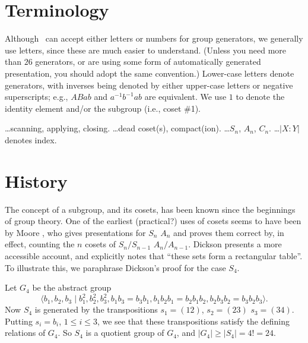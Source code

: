 
%
%

\section{Terminology}

Although \ace\ can accept either letters or numbers for group generators,
  we generally use letters, since these are much easier to understand.
(Unless you need more than $26$ generators, or are using some form of 
  automatically generated presentation, you should adopt the same
  convention.)
Lower-case letters denote generators, with inverses being denoted by either
  upper-case letters or negative superscripts; e.g., $ABab$ and
  $a^{-1}b^{-1}ab$ are equivalent.
We use $1$ to denote the identity element and/or the subgroup (i.e.,
  coset \#1).

\dots scanning, applying, closing.
\dots dead coset(s), compact(ion).
\dots $S_n$, $A_n$, $C_n$.
\dots $|X:Y|$ denotes index.

\section{History}

The concept of a subgroup, and its cosets, has been known since the 
  beginnings of group theory.
One of the earliest (practical?) uses of cosets seems to have been by
  Moore \cite{Moo}, who gives presentations for $S_n$ \amp $A_n$ and
  proves them correct by, in effect, counting the $n$ cosets of 
  $S_n/S_{n-1}$ \amp $A_n/A_{n-1}$.
Dickson \cite[\S264]{Dic} presents a more accessible account, and 
  explicitly notes that ``these sets form a rectangular table''\kern-2pt.
%
To illustrate this, we paraphrase Dickson's proof for the case $S_4$.

Let $G_4$ be the abstract group
  $$ \langle b_1,b_2,b_3 \mid b_1^2,b_2^2,b_3^2,
       b_1b_3=b_3b_1, b_1b_2b_1=b_2b_1b_2,b_2b_3b_2=b_3b_2b_3 \rangle . $$
Now $S_4$ is generated by the transpositions $s_1=(12)$, $s_2=(23)$ \amp 
  $s_3=(34)$.
Putting $s_i=b_i$, $1 \le i \le 3$, we see that these transpositions 
  satisfy the defining relations of $G_4$.
So $S_4$ is a quotient group of $G_4$, and $|G_4| \ge |S_4| = 4! = 24$.

